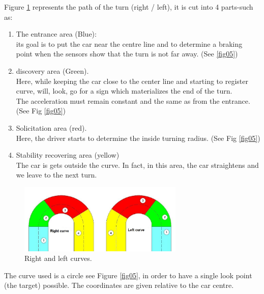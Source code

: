 \documentclass{llncs}
\begin{document}
Figure \ref {fig04} represents the path of the turn (right / left), it is cut into 4 parts-such as:
\begin{enumerate}
	\item  The entrance area (Blue):\\
	its goal is to put the car near the centre line and to determine a braking point when the sensors show that the turn is not far away. (See \ref {fig05})
	
	\item discovery area (Green).\\
	Here, while keeping the car close to the center line and starting to register curve, will, look, go for a sign which materializes the end of the turn.\\
	The acceleration must remain constant and the same as from the entrance. (See Fig \ref {fig05})
	\item Solicitation area (red).\\		
	Here, the driver starts to determine the inside turning radius. (See Fig \ref {fig05})
	\item Stability recovering area (yellow)\\
	The car is gets outside the curve. In fact, in this area, the car straightens and we leave to the next turn.
\end{enumerate}
\begin{figure}[h!]
	\centering
	\includegraphics[width=0.7\textwidth]{fig/virage.PNG}
	\begin{minipage}{10cm}
		\centering
		\caption{\footnotesize Right and left curves.}
		\label{fig04}
	\end{minipage} 
	
\end{figure}

The curve used is a circle see Figure \ref {fig05}, in order to have a single look point (the target) possible.
The coordinates are given relative to the car centre. \\	
\end{document}
